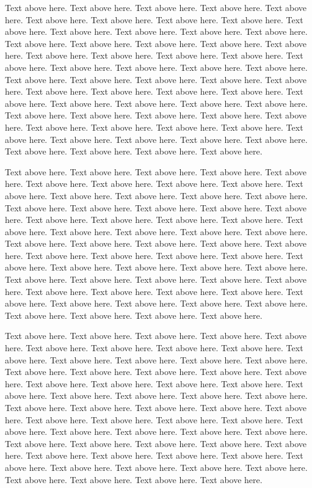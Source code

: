 \documentclass{sig-alternate}
\begin{document}
Text above here. Text above here. Text above here. Text above here. Text above here. Text above here. Text above here. Text above here. Text above here. Text above here. Text above here. Text above here. Text above here. Text above here. Text above here. Text above here. Text above here. Text above here. Text above here. Text above here. Text above here. Text above here. Text above here. Text above here. Text above here. Text above here. Text above here. Text above here. Text above here. Text above here. Text above here. Text above here. Text above here. Text above here. Text above here. Text above here. Text above here. Text above here. Text above here. Text above here. Text above here. Text above here. Text above here. Text above here. Text above here. Text above here. Text above here. Text above here. Text above here. Text above here. Text above here. Text above here. Text above here. Text above here. Text above here. Text above here. Text above here. Text above here. Text above here. Text above here. 

Text above here. Text above here. Text above here. Text above here. Text above here. Text above here. Text above here. Text above here. Text above here. Text above here. Text above here. Text above here. Text above here. Text above here. Text above here. Text above here. Text above here. Text above here. Text above here. Text above here. Text above here. Text above here. Text above here. Text above here. Text above here. Text above here. Text above here. Text above here. Text above here. Text above here. Text above here. Text above here. Text above here. Text above here. Text above here. Text above here. Text above here. Text above here. Text above here. Text above here. Text above here. Text above here. Text above here. Text above here. Text above here. Text above here. Text above here. Text above here. Text above here. Text above here. Text above here. Text above here. Text above here. Text above here. Text above here. Text above here. Text above here. Text above here. Text above here. Text above here. 

Text above here. Text above here. Text above here. Text above here. Text above here. Text above here. Text above here. Text above here. Text above here. Text above here. Text above here. Text above here. Text above here. Text above here. Text above here. Text above here. Text above here. Text above here. Text above here. Text above here. Text above here. Text above here. Text above here. Text above here. Text above here. Text above here. Text above here. Text above here. Text above here. Text above here. Text above here. Text above here. Text above here. Text above here. Text above here. Text above here. Text above here. Text above here. Text above here. Text above here. Text above here. Text above here. Text above here. Text above here. Text above here. Text above here. Text above here. Text above here. Text above here. Text above here. Text above here. Text above here. Text above here. Text above here. Text above here. Text above here. Text above here. Text above here. Text above here. Text above here. 
\end{document}
